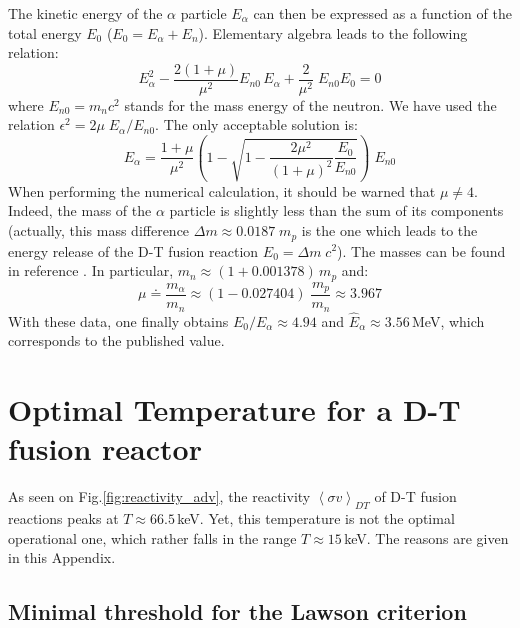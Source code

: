 The kinetic energy of the $\alpha$ particle $E_\alpha$ can then be expressed as a function of the total energy $E_0$ ($E_0 =E_\alpha + E_n$). Elementary algebra leads to the following relation:
\begin{equation}
    E_\alpha^2 - \frac{2(1+\mu)}{\mu^2}E_{n0}\, E_\alpha + \frac{2}{\mu^2}\; E_{n0}E_0 = 0
\end{equation}
where $E_{n0} = m_nc^2$ stands for the mass energy of the neutron. We have used the relation $\epsilon^2 = 2\mu\; E_\alpha/E_{n0}$. The only acceptable solution is:
\begin{equation}
    E_\alpha = \frac{1+\mu}{\mu^2}
    \left( 1 - \sqrt{1-\frac{2\mu^2}{(1+\mu)^2}\frac{E_0}{E_{n0}}}\right)\; E_{n0}
\end{equation}
When performing the numerical calculation, it should be warned that $\mu\neq 4$. 
Indeed, the mass of the $\alpha$ particle is slightly less than the sum of its components (actually, this mass difference $\Delta m \approx 0.0187\; m_p$ is the one which leads to the energy release of the D-T fusion reaction $E_0 = \Delta m\;c^2$). The masses can be found in reference . In particular, $m_n \approx (1+0.001378)\, m_p$ and:
$$
    \mu \doteq \frac{m_\alpha}{m_n} \approx (1-0.027404)\; \frac{m_p}{m_n} \approx 3.967
$$
With these data, one finally obtains $E_0/E_\alpha \approx 4.94$ and $\hat E_\alpha \approx 3.56\,$MeV, which corresponds to the published value.  

\section{Optimal Temperature for a D-T fusion reactor}
\label{appendix:temperature}

As seen on Fig.\ref{fig:reactivity_adv}, the reactivity $\left< \sigma v \right>_{DT}$ of D-T fusion reactions peaks at $T\approx 66.5\,$keV. Yet, this temperature is not the optimal operational one, which rather falls in the range $T\approx 15\,$keV. The reasons are given in this Appendix.


\subsection{Minimal threshold for the Lawson criterion}

